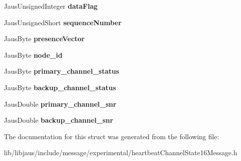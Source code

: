 \begin{DoxyCompactItemize}
\item 
\hypertarget{struct_heartbeat_channel_state16_message_struct_a6d38b486dd5739003a59826d83c746b7}{\-Jaus\-Unsigned\-Integer {\bfseries data\-Flag}}\label{struct_heartbeat_channel_state16_message_struct_a6d38b486dd5739003a59826d83c746b7}

\item 
\hypertarget{struct_heartbeat_channel_state16_message_struct_abd46d56cac686234077be397516863d8}{\-Jaus\-Unsigned\-Short {\bfseries sequence\-Number}}\label{struct_heartbeat_channel_state16_message_struct_abd46d56cac686234077be397516863d8}

\item 
\hypertarget{struct_heartbeat_channel_state16_message_struct_a8134fd913224b518505e3c27b38f2634}{\-Jaus\-Byte {\bfseries presence\-Vector}}\label{struct_heartbeat_channel_state16_message_struct_a8134fd913224b518505e3c27b38f2634}

\item 
\hypertarget{struct_heartbeat_channel_state16_message_struct_a5daa9587fc66c7aa7ef8f42c04bef952}{\-Jaus\-Byte {\bfseries node\-\_\-id}}\label{struct_heartbeat_channel_state16_message_struct_a5daa9587fc66c7aa7ef8f42c04bef952}

\item 
\hypertarget{struct_heartbeat_channel_state16_message_struct_a02e0f9a9fbd3a7beaa3f7b0b750ee36c}{\-Jaus\-Byte {\bfseries primary\-\_\-channel\-\_\-status}}\label{struct_heartbeat_channel_state16_message_struct_a02e0f9a9fbd3a7beaa3f7b0b750ee36c}

\item 
\hypertarget{struct_heartbeat_channel_state16_message_struct_a566b63605587f1a5a13da78f2cd28153}{\-Jaus\-Byte {\bfseries backup\-\_\-channel\-\_\-status}}\label{struct_heartbeat_channel_state16_message_struct_a566b63605587f1a5a13da78f2cd28153}

\item 
\hypertarget{struct_heartbeat_channel_state16_message_struct_a9d782a065e88de35e5c7d7112d701d6a}{\-Jaus\-Double {\bfseries primary\-\_\-channel\-\_\-snr}}\label{struct_heartbeat_channel_state16_message_struct_a9d782a065e88de35e5c7d7112d701d6a}

\item 
\hypertarget{struct_heartbeat_channel_state16_message_struct_a1df801f365ac7730803856961b319149}{\-Jaus\-Double {\bfseries backup\-\_\-channel\-\_\-snr}}\label{struct_heartbeat_channel_state16_message_struct_a1df801f365ac7730803856961b319149}

\end{DoxyCompactItemize}


\-The documentation for this struct was generated from the following file\-:\begin{DoxyCompactItemize}
\item 
lib/libjaus/include/message/experimental/heartbeat\-Channel\-State16\-Message.\-h\end{DoxyCompactItemize}
